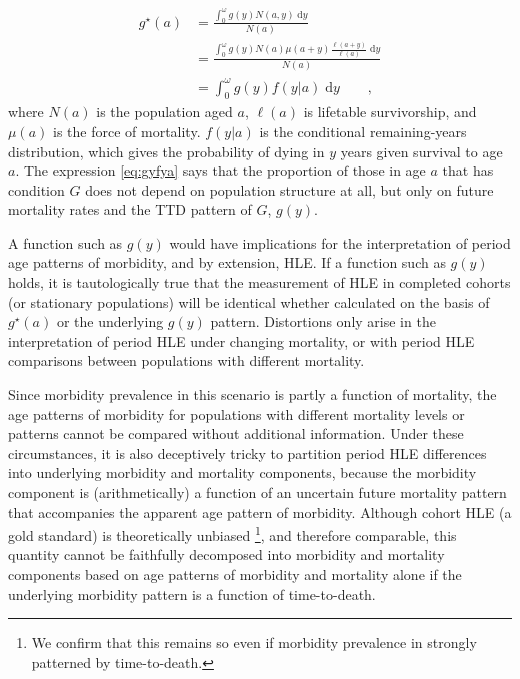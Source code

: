 \documentclass[11pt,oneside,a4paper]{article} %
\newcommand{\dd}{\; \mathrm{d}}
\newcommand{\tc}{\quad\quad\text{,}}
\begin{document}
\begin{align}
g^\star(a) &= \frac{\int _0^\omega g(y) N(a,y) \dd y}{N(a)} \\
      &= \frac{\int _0^\omega g(y) N(a)
      \mu(a+y)\frac{\ell(a+y)}{\ell(a)}\dd y}{N(a)}\\
      &= \int _0^\omega g(y) f(y|a)\dd y \label{eq:gyfya}\tc
\end{align}
where $N(a)$ is the population aged $a$, $\ell(a)$ is lifetable survivorship, and
$\mu(a)$ is the force of mortality. $f(y|a)$ is the conditional remaining-years
distribution, which gives the probability of dying in $y$ years given survival
to age $a$. The expression \eqref{eq:gyfya} says that the proportion of those in
age $a$ that has condition $G$ does not depend on population structure at all, but only on future mortality rates and the TTD pattern of $G$, $g(y)$. 

A function such as $g(y)$ would have implications for the interpretation of
period age patterns of morbidity, and by extension, HLE. If a function such as $g(y)$ holds, it is tautologically true that the
measurement of HLE in completed cohorts (or stationary populations)
will be identical whether calculated on the basis of $g^\star(a)$ or the
underlying $g(y)$ pattern. Distortions only arise in the interpretation of
period HLE under changing mortality, or with period HLE comparisons between
populations with different mortality. 


Since morbidity prevalence in this scenario is partly a function of mortality,
 the age patterns of morbidity for populations with different mortality
levels or patterns cannot be compared without additional information. Under
these circumstances, it is also deceptively tricky to partition period HLE
differences into underlying morbidity and mortality components, because the
morbidity component is (arithmetically) a function of an uncertain future mortality pattern
that accompanies the apparent age pattern of morbidity. Although cohort HLE (a
gold standard) is theoretically unbiased \citep{imai2007estimation}\footnote{We confirm that this remains so even if morbidity prevalence in strongly patterned by time-to-death.}, and therefore comparable, this quantity cannot be faithfully
decomposed into morbidity and mortality components based on age patterns of morbidity and mortality alone if
the underlying morbidity pattern is a function of time-to-death.
\end{document}

